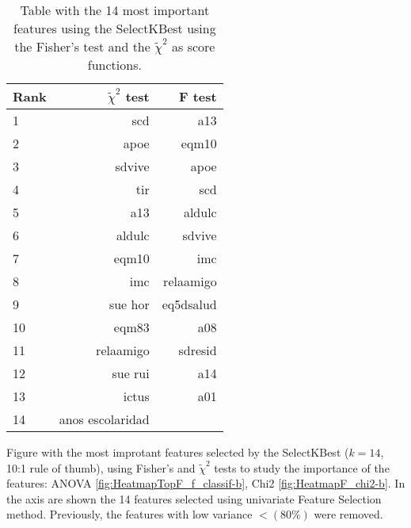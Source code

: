 \documentclass[preprint,12pt]{elsarticle}
\begin{document}
\begin{table}[h!]
  \begin{center}
    \caption{Table with the 14 most important features using the SelectKBest using the Fisher's test and the $\tilde{\chi}^2$ as score functions.}
    \label{tab:selectk}
    \begin{tabular}{l|r|r} %
      Rank & $\tilde{\chi}^2$ test & F test\\
      \hline
      1 & scd & a13\\
      2 &  apoe & eqm10\\
      3 &  sdvive & apoe\\
      4 &  tir& scd \\
      5 &  a13 & aldulc\\
      6 &  aldulc& sdvive\\
      7 &  eqm10& imc\\
      8 &  imc& relaamigo\\
      9 &  sue hor& eq5dsalud\\
      10 & eqm83& a08\\
      11 & relaamigo& sdresid\\
      12 & sue rui& a14\\
      13 & ictus& a01\\
      14 & anos escolaridad& \\
    \end{tabular}
  \end{center}
\end{table}




Figure with the most improtant features selected by the SelectKBest ($k=14$, 10:1 rule of thumb), using Fisher's and $\tilde{\chi}^2$  tests to study the importance of the features: ANOVA \ref{fig:HeatmapTopF_f_classif-b}, Chi2 \ref{fig:HeatmapF_chi2-b}.
In the axis are shown the 14 features selected using univariate Feature Selection method. Previously,  the features with low variance $<(80\%)$ were removed.
\end{document}
